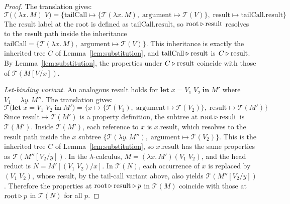 \begin{proof}
  The translation gives:
  \[
    \mathcal{T}\bigl((\lambda x.\, M)\; V\bigr) =
    \{\mathrm{tailCall} \mapsto
      \{\mathcal{T}(\lambda x.\, M),\;
      \mathrm{argument} \mapsto \mathcal{T}(V)\},\;
      \mathrm{result} \mapsto
    \mathrm{tailCall}.\mathrm{result}\}
  \]
  The $\mathrm{result}$ label at the root is defined as
  $\mathrm{tailCall}.\mathrm{result}$, so
  $\text{root} \mathbin{\triangleright} \mathrm{result}$ resolves to the
  $\mathrm{result}$ path inside the inheritance
  $\mathrm{tailCall} = \{\mathcal{T}(\lambda x.\, M),\;
  \mathrm{argument} \mapsto \mathcal{T}(V)\}$.
  This inheritance is exactly the inherited tree $C$ of
  Lemma~\ref{lem:substitution}, and
  $\mathrm{tailCall} \mathbin{\triangleright} \mathrm{result}$ is
  $C \mathbin{\triangleright} \mathrm{result}$.
  By Lemma~\ref{lem:substitution}, the properties under
  $C \mathbin{\triangleright} \mathrm{result}$ coincide with those of
  $\mathcal{T}(M[V/x])$.

  \medskip\noindent
  \emph{Let-binding variant.}
  An analogous result holds for
  $\mathbf{let}\; x = V_1\; V_2 \;\mathbf{in}\; M'$
  where $V_1 = \lambda y.\, M''$.
  The translation gives:
  \[
    \mathcal{T}\bigl(\mathbf{let}\; x = V_1\; V_2
    \;\mathbf{in}\; M'\bigr) =
    \{x \mapsto \{\mathcal{T}(V_1),\;
      \mathrm{argument} \mapsto \mathcal{T}(V_2)\},\;
    \mathrm{result} \mapsto \mathcal{T}(M')\}
  \]
  Since $\mathrm{result} \mapsto \mathcal{T}(M')$ is a property
  definition, the subtree at
  $\text{root} \mathbin{\triangleright} \mathrm{result}$ is $\mathcal{T}(M')$.
  Inside $\mathcal{T}(M')$, each reference to $x$ is
  $x.\mathrm{result}$, which resolves to the $\mathrm{result}$
  path inside the $x$ subtree
  $\{\mathcal{T}(\lambda y.\, M''),\;
  \mathrm{argument} \mapsto \mathcal{T}(V_2)\}$.
  This is the inherited tree $C$ of
  Lemma~\ref{lem:substitution}, so
  $x.\mathrm{result}$ has the same properties as
  $\mathcal{T}(M''[V_2/y])$.
  In the $\lambda$-calculus,
  $M = (\lambda x.\, M')(V_1\; V_2)$, and the head reduct is
  $N = M'[(V_1\; V_2)/x]$.
  In $\mathcal{T}(N)$, each occurrence of $x$ is replaced by
  $(V_1\; V_2)$, whose result, by the tail-call variant above,
  also yields $\mathcal{T}(M''[V_2/y])$.
  Therefore the properties at
  $\text{root} \mathbin{\triangleright} \mathrm{result} \mathbin{\triangleright} p$ in
  $\mathcal{T}(M)$ coincide with those at
  $\text{root} \mathbin{\triangleright} p$ in $\mathcal{T}(N)$ for all $p$.


\end{proof}
